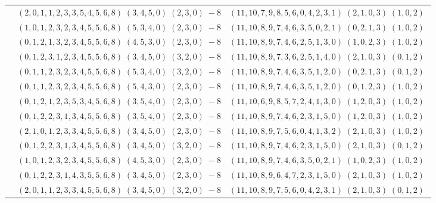 \documentclass[11pt]{article}
\begin{document}
\begin{longtable}[l]{|c|c|c|}
 \cline{2-3} 
 & $(2 ,0 ,1 ,1 ,2 ,3 ,3 ,5 ,4 ,5 ,6 ,8) \;(3 ,4 ,5 ,0) \;(2 ,3 ,0) \;-8$ & $(11 ,10 ,7 ,9 ,8 ,5 ,6 ,0 ,4 ,2 ,3 ,1) \;(2 ,1 ,0 ,3) \;(1 ,0 ,2) \;$\\ 
 \cline{2-3} 
 & $(1 ,0 ,1 ,2 ,3 ,2 ,3 ,4 ,5 ,5 ,6 ,8) \;(5 ,3 ,4 ,0) \;(2 ,3 ,0) \;-8$ & $(11 ,10 ,8 ,9 ,7 ,4 ,6 ,3 ,5 ,0 ,2 ,1) \;(0 ,2 ,1 ,3) \;(1 ,0 ,2) \;$\\ 
 \cline{2-3} 
 & $(0 ,1 ,2 ,1 ,3 ,2 ,3 ,4 ,5 ,5 ,6 ,8) \;(4 ,5 ,3 ,0) \;(2 ,3 ,0) \;-8$ & $(11 ,10 ,8 ,9 ,7 ,4 ,6 ,2 ,5 ,1 ,3 ,0) \;(1 ,0 ,2 ,3) \;(1 ,0 ,2) \;$\\ 
 \cline{2-3} 
 & $(0 ,1 ,2 ,3 ,1 ,2 ,3 ,4 ,5 ,5 ,6 ,8) \;(3 ,4 ,5 ,0) \;(3 ,2 ,0) \;-8$ & $(11 ,10 ,8 ,9 ,7 ,3 ,6 ,2 ,5 ,1 ,4 ,0) \;(2 ,1 ,0 ,3) \;(0 ,1 ,2) \;$\\ 
 \cline{2-3} 
 & $(0 ,1 ,1 ,2 ,3 ,2 ,3 ,4 ,5 ,5 ,6 ,8) \;(5 ,3 ,4 ,0) \;(3 ,2 ,0) \;-8$ & $(11 ,10 ,8 ,9 ,7 ,4 ,6 ,3 ,5 ,1 ,2 ,0) \;(0 ,2 ,1 ,3) \;(0 ,1 ,2) \;$\\ 
 \cline{2-3} 
 & $(0 ,1 ,1 ,2 ,3 ,2 ,3 ,4 ,5 ,5 ,6 ,8) \;(5 ,4 ,3 ,0) \;(2 ,3 ,0) \;-8$ & $(11 ,10 ,8 ,9 ,7 ,4 ,6 ,3 ,5 ,1 ,2 ,0) \;(0 ,1 ,2 ,3) \;(1 ,0 ,2) \;$\\ 
 \cline{2-3} 
 & $(0 ,1 ,2 ,1 ,2 ,3 ,5 ,3 ,4 ,5 ,6 ,8) \;(3 ,5 ,4 ,0) \;(2 ,3 ,0) \;-8$ & $(11 ,10 ,6 ,9 ,8 ,5 ,7 ,2 ,4 ,1 ,3 ,0) \;(1 ,2 ,0 ,3) \;(1 ,0 ,2) \;$\\ 
 \cline{2-3} 
 & $(0 ,1 ,2 ,2 ,3 ,1 ,3 ,4 ,5 ,5 ,6 ,8) \;(3 ,5 ,4 ,0) \;(2 ,3 ,0) \;-8$ & $(11 ,10 ,8 ,9 ,7 ,4 ,6 ,2 ,3 ,1 ,5 ,0) \;(1 ,2 ,0 ,3) \;(1 ,0 ,2) \;$\\ 
 \cline{2-3} 
 & $(2 ,1 ,0 ,1 ,2 ,3 ,3 ,4 ,5 ,5 ,6 ,8) \;(3 ,4 ,5 ,0) \;(2 ,3 ,0) \;-8$ & $(11 ,10 ,8 ,9 ,7 ,5 ,6 ,0 ,4 ,1 ,3 ,2) \;(2 ,1 ,0 ,3) \;(1 ,0 ,2) \;$\\ 
 \cline{2-3} 
 & $(0 ,1 ,2 ,2 ,3 ,1 ,3 ,4 ,5 ,5 ,6 ,8) \;(3 ,4 ,5 ,0) \;(3 ,2 ,0) \;-8$ & $(11 ,10 ,8 ,9 ,7 ,4 ,6 ,2 ,3 ,1 ,5 ,0) \;(2 ,1 ,0 ,3) \;(0 ,1 ,2) \;$\\ 
 \cline{2-3} 
 & $(1 ,0 ,1 ,2 ,3 ,2 ,3 ,4 ,5 ,5 ,6 ,8) \;(4 ,5 ,3 ,0) \;(2 ,3 ,0) \;-8$ & $(11 ,10 ,8 ,9 ,7 ,4 ,6 ,3 ,5 ,0 ,2 ,1) \;(1 ,0 ,2 ,3) \;(1 ,0 ,2) \;$\\ 
 \cline{2-3} 
 & $(0 ,1 ,2 ,2 ,3 ,1 ,4 ,3 ,5 ,5 ,6 ,8) \;(3 ,4 ,5 ,0) \;(2 ,3 ,0) \;-8$ & $(11 ,10 ,8 ,9 ,6 ,4 ,7 ,2 ,3 ,1 ,5 ,0) \;(2 ,1 ,0 ,3) \;(1 ,0 ,2) \;$\\ 
 \cline{2-3} 
 & $(2 ,0 ,1 ,1 ,2 ,3 ,3 ,4 ,5 ,5 ,6 ,8) \;(3 ,4 ,5 ,0) \;(3 ,2 ,0) \;-8$ & $(11 ,10 ,8 ,9 ,7 ,5 ,6 ,0 ,4 ,2 ,3 ,1) \;(2 ,1 ,0 ,3) \;(0 ,1 ,2) \;$\\ 

\end{longtable}
\end{document}
